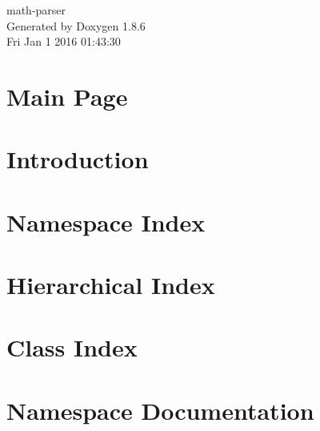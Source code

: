 \documentclass[twoside]{book}
\newcommand{\clearemptydoublepage}{%
  \newpage{\pagestyle{empty}\cleardoublepage}%
}
\begin{document}
\hypersetup{pageanchor=false}
\begin{titlepage}
\vspace*{7cm}
\begin{center}%
{\Large math-\/parser }\\
\vspace*{1cm}
{\large Generated by Doxygen 1.8.6}\\
\vspace*{0.5cm}
{\small Fri Jan 1 2016 01:43:30}\\
\end{center}
\end{titlepage}
\clearemptydoublepage
\tableofcontents
\clearemptydoublepage
{}
\hypersetup{pageanchor=true}

\chapter{Main Page}
\label{index}\hypertarget{index}{}
\chapter{Introduction}
\label{md_src_MathParser_GRAMMAR}
\hypertarget{md_src_MathParser_GRAMMAR}{}

\chapter{Namespace Index}

\chapter{Hierarchical Index}

\chapter{Class Index}

\chapter{Namespace Documentation}



\end{document}
